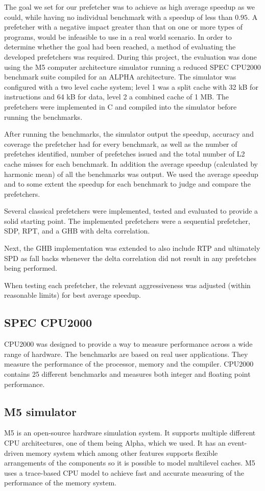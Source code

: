 The goal we set for our prefetcher was to achieve as high average speedup as we could, while having no individual benchmark with a speedup of less than $0.95$.
A prefetcher with a negative impact greater than that on one or more types of programs, would be infeasible to use in a real world scenario.
In order to determine whether the goal had been reached, a method of evaluating the developed prefetchers was required.
During this project, the evaluation was done using the M5 computer architecture simulator running a reduced SPEC CPU2000 benchmark suite compiled for an ALPHA architecture.
The simulator was configured with a two level cache system; level 1 was a split cache with 32 kB for instructions and 64 kB for data, level 2 a combined cache of 1 MB.
The prefetchers were implemented in C and compiled into the simulator before running the benchmarks.

After running the benchmarks, the simulator output the speedup, accuracy and coverage the prefetcher had for every benchmark, as well as the number of prefetches identified,
number of prefetches issued and the total number of L2 cache misses for each benchmark. In addition the average speedup (calculated by harmonic mean) of all the benchmarks
was output. We used the average speedup and to some extent the speedup for each benchmark to judge and compare the prefetchers.

Several classical prefetchers were implemented, tested and evaluated to provide a solid starting point.
The implemented prefetchers were a sequential prefetcher, SDP, RPT, and a GHB with delta correlation.

Next, the GHB implementation was extended to also include RTP and ultimately SPD as fall backs whenever the delta correlation did not result in any prefetches being performed.

When testing each prefetcher, the relevant aggressiveness was adjusted (within reasonable limits) for best average speedup.

\subsection{SPEC CPU2000}
CPU2000 was designed to provide a way to measure performance across
a wide range of hardware. The benchmarks are based on real user
applications. They measure the performance of the processor, memory
and the compiler. CPU2000 contains 25 different benchmarks and
measures both integer and floating point performance.

\cite{bib:cpu2000}

\subsection{M5 simulator}
M5 is an open-source hardware simulation system. It supports multiple
different CPU architectures, one of them being Alpha, which we used.
It has an event-driven memory system which among other features supports
flexible arrangements of the components so it is possible to model
multilevel caches. M5 uses a trace-based CPU model to achieve fast and
accurate measuring of the performance of the memory system.

\cite{bib:m5}
